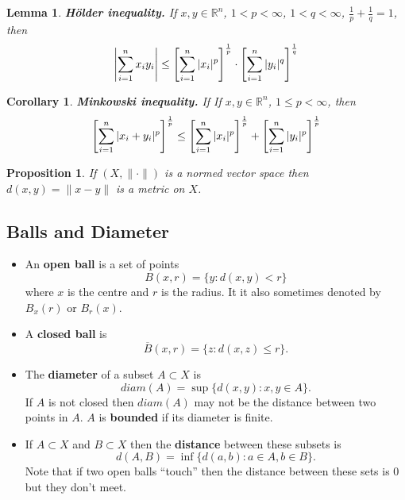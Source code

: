 \documentclass[two column]{article}
\newtheorem{lemma}[theorem]{Lemma}
\newtheorem{proposition}[theorem]{Proposition}
\newtheorem{corollary}[theorem]{Corollary}
\begin{document}
\begin{lemma}
{\bf H\"older inequality.} If $x, y \in \mathbb{R}^{n}$, $1 < p < \infty$, $1 < q < \infty$, $\frac{1}{p} + \frac{1}{q} = 1$, then \vspace{-10pt}
\[
\left\vert \sum_{i=1}^{n} x_{i} y_{i} \right\vert \leq \left[ \sum_{i=1}^{n} \vert x_{i} \vert^{p} \right]^{\frac{1}{p}} \cdot \left[ \sum_{i=1}^{n} \vert y_{i} \vert^{q} \right]^{\frac{1}{q}} \vspace{5pt}
\]
\end{lemma}

\begin{corollary}
{\bf Minkowski inequality.} If If $x, y \in \mathbb{R}^{n}$, $1 \leq p < \infty$, then \vspace{-10pt}
\[
\left[ \sum_{i=1}^{n} \vert x_{i} + y_{i} \vert^{p} \right]^{\frac{1}{p}} \leq \left[ \sum_{i=1}^{n} \vert x_{i} \vert^{p} \right]^{\frac{1}{p}} + \left[ \sum_{i=1}^{n} \vert y_{i} \vert^{p} \right]^{\frac{1}{p}} \vspace{5pt}
\]
\end{corollary}

\begin{proposition} \label{norm to metric}
If $(X, \lVert \cdot \rVert)$ is a normed vector space then $d(x,y) = \lVert x - y \rVert$ is a metric on $X$.
\end{proposition}

\subsection{Balls and Diameter} \label{bounded}

\begin{itemize}
\item An {\bf open ball} is a set of points 
\[ B(x,r) = \lbrace y: d(x,y)<r \rbrace \]
where $x$ is the centre and $r$ is the radius. It it also sometimes denoted by $B_{x}(r)$ or $B_{r}(x)$. 
\item A {\bf closed ball} is 
\[ \overline{B}(x,r) = \lbrace z: d(x,z) \leq r \rbrace. \]
\item The {\bf diameter} of a subset $A \subset X$ is 
\[ diam(A) = \sup \lbrace d(x,y): x,y \in A \rbrace. \]
If $A$ is not closed then $diam(A)$ may not be the distance between two points in $A$. $A$ is {\bf bounded} if its diameter is finite.  
\item If $A \subset X$ and $B \subset X$ then the {\bf distance} between these subsets is
\[ d(A,B) = \inf \lbrace d(a,b): a \in A, b \in B \rbrace. \]
Note that if two open balls ``touch'' then the distance between these sets is $0$ but they don't meet.
\end{itemize}
\end{document}
